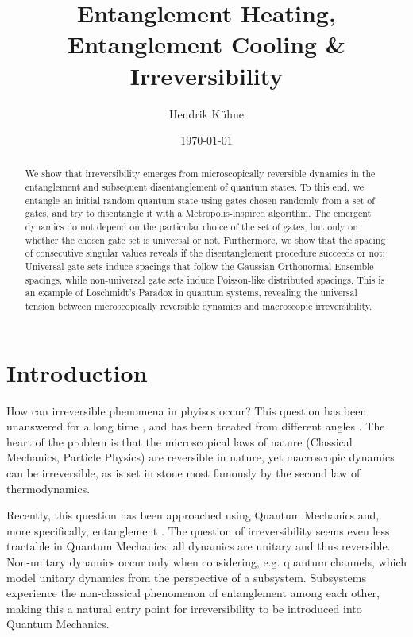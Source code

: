 \documentclass[reprint,amsmath,amssymb,aps,prb,nofootinbib]{revtex4-2}
\begin{document}
    \title{Entanglement Heating, Entanglement Cooling \& Irreversibility}
    \author{Hendrik Kühne}
    \date{\today}

    \begin{abstract}
        We show that irreversibility emerges from microscopically reversible dynamics in the entanglement
        and subsequent disentanglement of quantum states. To this end, we entangle an initial random quantum state
        using gates chosen randomly from a set of gates, and try to disentangle it with a Metropolis-inspired
        algorithm. The emergent dynamics do not depend on the particular choice of the set of gates, but only
        on whether the chosen gate set is universal or not. Furthermore, we show that the spacing of consecutive
        singular values reveals if the disentanglement procedure succeeds or not: Universal gate sets induce spacings
        that follow the Gaussian Orthonormal Ensemble spacings, while non-universal gate sets induce Poisson-like
        distributed spacings. This is an example of Loschmidt's
        Paradox in quantum systems, revealing the universal tension between microscopically reversible dynamics
        and macroscopic irreversibility.
    \end{abstract}

    \maketitle

    \section{Introduction}

    How can irreversible phenomena in phyiscs occur? This question has been unanswered for a long time
    \cite{Loschmidt:1876:LoschmidtParadox}, and has been treated from different angles
    \cite{Haar:1955:FoundationsStatisticalMechanics,Shaffer:2014:IrreversibilityAndEntanglement}. The heart of
    the problem is that the microscopical laws of nature (Classical Mechanics, Particle Physics) are reversible
    in nature, yet macroscopic dynamics can be irreversible, as is set in stone most famously by the second law
    of thermodynamics.

    Recently, this question has been approached using Quantum Mechanics and, more specifically, entanglement
    \cite{Shaffer:2014:IrreversibilityAndEntanglement,Odavic:2023:RandomUnitaries,Chamon:2014:EmergentIrreversibility}.
    The question of irreversibility seems even less tractable in Quantum Mechanics; all dynamics are unitary and
    thus reversible. Non-unitary dynamics occur only when considering, e.g. quantum channels, which model unitary
    dynamics from the perspective of a subsystem. Subsystems experience the non-classical phenomenon of entanglement
    among each other, making this a natural entry point for irreversibility to be introduced into Quantum Mechanics.
\end{document}
